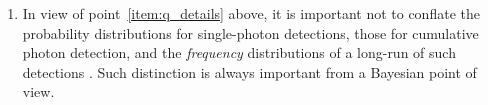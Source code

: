 \documentclass[\ifafour a4paper,12pt,\else a5paper,10pt,\fi%
onecolumn,oneside,article,%
british%
]{memoir}
\newcommand*{\defquote}[1]{`\,#1\,'}
\theoremstyle{remark}
\theoremstyle{innote}
\newcommand*{\citep}{\parencites}%
\newcommand*{\ibid}{\unspace\addtocounter{footnote}{-1}\footnotemark{}}
\newcommand*{\amp}{\&}
\renewcommand*{\|}[1][]{\nonscript\,#1\vert\nonscript\;\mathopen{}}
\newcommand*{\sect}{\S}%
\newcommand*{\eqn}{eq.}%
\newcommand*{\eg}{{e.g.}}
\begin{document}
\begin{enumerate}[label=(\textbf{\roman*})]
\item\label{item:q_prob_freq} In view of point~\ref{item:q_details} above,
  it is important not to conflate the probability distributions for
  single-photon detections, those for cumulative photon detection, and the
  \emph{frequency} distributions of a long-run of such detections
  \citep[\sect~2, seem to conflate the two]{gelmanetal2020}. Such
  distinction is always important from a Bayesian point of view.
%  


%
\end{enumerate}
\end{document}
